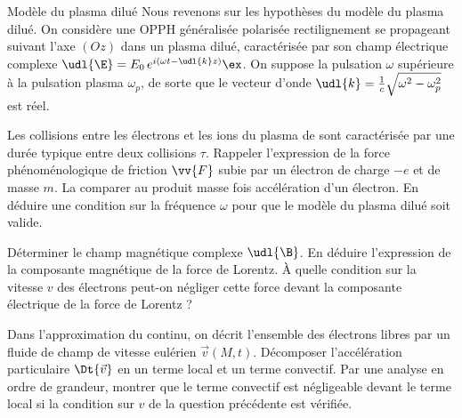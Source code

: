 \begin{exo}[PC][2][TD]{Modèle du plasma dilué}
  Nous revenons sur les hypothèses du modèle du plasma dilué. On considère une OPPH généralisée polarisée rectilignement se propageant suivant l'axe $(Oz)$ dans un plasma dilué, caractérisée par son champ électrique complexe $\udl{\E}=E_0 \,e^{i(\omega t - \udl{k} z)} \ex$. On suppose la pulsation $\omega$ supérieure à la pulsation plasma $\omega_p$, de sorte que le vecteur d'onde $\udl{k}=\textstyle\frac{1}{c}\sqrt{\omega^2-\omega_p^2}$ est réel.
  \begin{quest}
    \item	Les collisions entre les électrons et les ions du plasma de sont caractérisée par une durée typique entre deux collisions $\tau$. Rappeler l'expression de la force phénoménologique de friction $\vv{F}$ subie par un électron de charge $-e$ et de masse $m$. La comparer au produit masse fois accélération d'un électron. En déduire une condition sur la fréquence $\omega$ pour que le modèle du plasma dilué soit valide.
    \item Déterminer le champ magnétique complexe $\udl{\B}$. En déduire l'expression de la composante magnétique de la force de Lorentz. À quelle condition sur la vitesse $v$ des électrons peut-on négliger cette force devant la composante électrique de la force de Lorentz ?
    \item Dans l'approximation du continu, on décrit l'ensemble des électrons libres par un fluide de champ de vitesse eulérien $\Vec{v}(M,t)$. Décomposer l'accélération particulaire $\Dt{\Vec{v}}$ en un terme local et un terme convectif. Par une analyse en ordre de grandeur, montrer que le terme convectif est négligeable devant le terme local si la condition sur $v$ de la question précédente est vérifiée.
  \end{quest} 
\end{exo}

